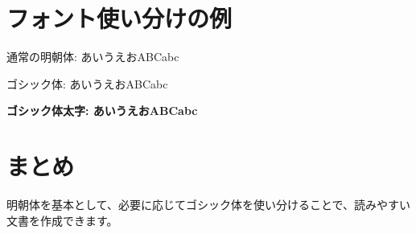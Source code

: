 \documentclass[12pt]{ltjsarticle} %
\begin{document}
\section{フォント使い分けの例}

通常の明朝体: あいうえおABCabc

{\sffamily ゴシック体: あいうえおABCabc} %

{\sffamily\bfseries ゴシック体太字: あいうえおABCabc} %

\section{まとめ}

明朝体を基本として、必要に応じてゴシック体を使い分けることで、読みやすい文書を作成できます。
\end{document}
